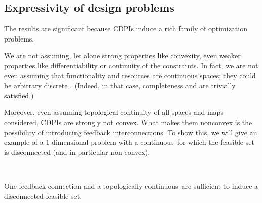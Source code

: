\subsection{Expressivity of  design problems}

The results are significant because CDPIs induce a rich family of optimization problems.

We are not assuming, let alone strong properties like convexity, even weaker properties like differentiability or continuity of the constraints.
In fact, we are not even assuming that functionality and resources are continuous spaces; they could be arbitrary discrete .
(Indeed, in that case, completeness and  are trivially satisfied.)

Moreover, even assuming topological continuity of all spaces and maps considered, CDPIs are strongly not convex.
What makes them nonconvex is the possibility of introducing feedback interconnections.
To show this, we will give an example of a 1-dimensional problem with a continuous~\ftor for which the feasible set is disconnected (and in particular non-convex).
\begin{marginfigure}
    \centering
     \\
    \caption{One feedback connection and a topologically continuous~\ftor are sufficient to induce a disconnected feasible set.}
    \label{fig:ceil-1}
\end{marginfigure}


